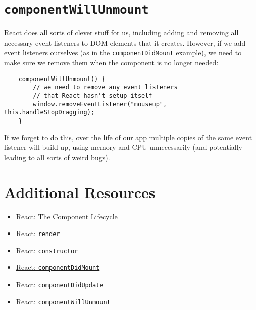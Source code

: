 \section{\texttt{componentWillUnmount}}

React does all sorts of clever stuff for us, including adding and removing all necessary event listeners to DOM elements that it creates. However, if we add event listeners ourselves (as in the \texttt{componentDidMount} example), we need to make sure we remove them when the component is no longer needed:

\begin{verbatim}
    componentWillUnmount() {
        // we need to remove any event listeners
        // that React hasn't setup itself
        window.removeEventListener("mouseup", this.handleStopDragging);
    }
\end{verbatim}

If we forget to do this, over the life of our app multiple copies of the same event listener will build up, using memory and CPU unnecessarily (and potentially leading to all sorts of weird bugs).


\section{Additional Resources}

\begin{itemize}[leftmargin=*]
    \item \href{https://reactjs.org/docs/react-component.html#the-component-lifecycle}{React: The Component Lifecycle}
    \item \href{https://reactjs.org/docs/react-component.html#render}{React: \texttt{render}}
    \item \href{https://reactjs.org/docs/react-component.html#constructor}{React: \texttt{constructor}}
    \item \href{https://reactjs.org/docs/react-component.html#componentdidmount}{React: \texttt{componentDidMount}}
    \item \href{https://reactjs.org/docs/react-component.html#componentdidupdate}{React: \texttt{componentDidUpdate}}
    \item \href{https://reactjs.org/docs/react-component.html#componentwillunmount}{React: \texttt{componentWillUnmount}}
\end{itemize}
